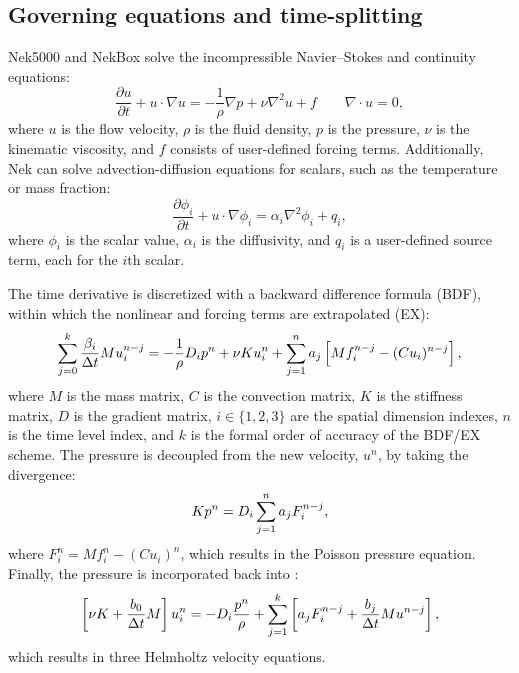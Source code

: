 \subsection{Governing equations and time-splitting}
Nek5000 and NekBox solve the incompressible Navier--Stokes and continuity equations:
\begin{equation}
\frac{\partial u}{\partial t} + u \cdot \nabla u = - \frac{1}{\rho} \nabla p + \nu \nabla^2 u + f \qquad
\nabla \cdot u = 0,
\end{equation}
where $u$ is the flow velocity, 
$\rho$ is the fluid density,
$p$ is the pressure,
$\nu$ is the kinematic viscosity,
and $f$ consists of user-defined forcing terms.
Additionally, Nek can solve advection-diffusion equations for scalars, such as the temperature or mass fraction:
\begin{equation}
\frac{\partial \phi_i}{\partial t} + u \cdot \nabla \phi_i =  \alpha_i \nabla^2 \phi_i + q_i,
\end{equation}
where $\phi_i$ is the scalar value, 
$\alpha_i$ is the diffusivity,
and $q_i$ is a user-defined source term, each for the $i$th scalar.

The time derivative is discretized with a backward difference formula (BDF), within which the nonlinear and forcing terms are extrapolated (EX):
\begin{equation}\elabel{semi}
\sum_{j=0}^k \frac{\beta_i}{\Delta t} M u_i^{n-j} = - \frac{1}{\rho} D_i p^n + \nu K u_i^n + \sum_{j=1}^n a_j\left[M f_i^{n-j} - (C u_i)^{n-j} \right],
\end{equation}
where $M$ is the mass matrix,
$C$ is the convection matrix,
$K$ is the stiffness matrix,
$D$ is the gradient matrix,
$i \in \{1,2,3\}$ are the spatial dimension indexes, 
$n$ is the time level index, and
$k$ is the formal order of accuracy of the BDF/EX scheme.
The pressure is decoupled from the new velocity, $u^n$, by taking the divergence:
\begin{equation} \elabel{pres}
K p^n = D_i \sum_{j=1}^n a_j F_i^{n-j},
\end{equation}
where $F_i^n = M f_i^n - (C u_i)^n$,
which results in the Poisson pressure equation.
Finally, the pressure is incorporated back into :
\begin{equation} \elabel{vel}
\left[\nu K + \frac{b_0}{\Delta t} M \right] u_i^n = -D_i \frac{p^n}{\rho} + \sum_{j=1}^k \left[a_j F_i^{n-j} + \frac{b_j}{\Delta t} M u^{n-j} \right], 
\end{equation}
which results in three Helmholtz velocity equations.

